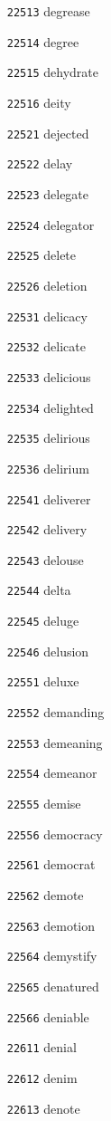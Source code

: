 \documentclass[twoside,11pt]{article}
\begin{document}
\begin{multicols}{5}
\begin{enumerate}
\item[\texttt{22513}] degrease
\item[\texttt{22514}] degree
\item[\texttt{22515}] dehydrate
\item[\texttt{22516}] deity
\item[\texttt{22521}] dejected
\item[\texttt{22522}] delay
\item[\texttt{22523}] delegate
\item[\texttt{22524}] delegator
\item[\texttt{22525}] delete
\item[\texttt{22526}] deletion
\item[\texttt{22531}] delicacy
\item[\texttt{22532}] delicate
\item[\texttt{22533}] delicious
\item[\texttt{22534}] delighted
\item[\texttt{22535}] delirious
\item[\texttt{22536}] delirium
\item[\texttt{22541}] deliverer
\item[\texttt{22542}] delivery
\item[\texttt{22543}] delouse
\item[\texttt{22544}] delta
\item[\texttt{22545}] deluge
\item[\texttt{22546}] delusion
\item[\texttt{22551}] deluxe
\item[\texttt{22552}] demanding
\item[\texttt{22553}] demeaning
\item[\texttt{22554}] demeanor
\item[\texttt{22555}] demise
\item[\texttt{22556}] democracy
\item[\texttt{22561}] democrat
\item[\texttt{22562}] demote
\item[\texttt{22563}] demotion
\item[\texttt{22564}] demystify
\item[\texttt{22565}] denatured
\item[\texttt{22566}] deniable
\item[\texttt{22611}] denial
\item[\texttt{22612}] denim
\item[\texttt{22613}] denote

\end{enumerate}
\end{multicols}
\end{document}
